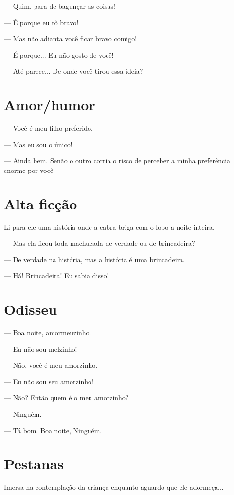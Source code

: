 --- Quim, para de bagunçar as coisas!

--- É porque eu tô bravo!

--- Mas não adianta você ficar bravo comigo!

--- É porque... Eu não gosto de você!

--- Até parece... De onde você tirou essa ideia?

\chapter{Amor/humor}\label{amorhumor}

--- Você é meu filho preferido.

--- Mas eu sou o único!

--- Ainda bem. Senão o outro corria o risco de perceber a minha
preferência enorme por você.

\chapter{Alta ficção}\label{alta-ficuxe7uxe3o}

Li para ele uma história onde a cabra briga com o lobo a noite inteira.

--- Mas ela ficou toda machucada de verdade ou de brincadeira?

--- De verdade na história, mas a história é uma brincadeira.

--- Há! Brincadeira! Eu sabia disso!

\chapter{Odisseu}\label{odisseu}

--- Boa noite, amormeuzinho.

--- Eu não sou melzinho!

--- Não, você é meu amorzinho.

--- Eu não sou seu amorzinho!

--- Não? Então quem é o meu amorzinho?

--- Ninguém.

--- Tá bom. Boa noite, Ninguém.

\chapter{Pestanas}\label{pestanas}

Imersa na contemplação da criança enquanto aguardo que ele adormeça...

